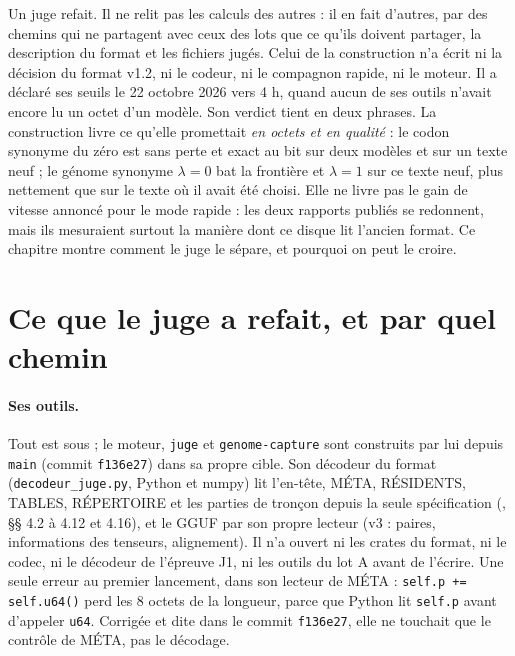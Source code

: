 \begin{enbref}
Un juge refait. Il ne relit pas les calculs des autres : il en fait d'autres, par des chemins qui ne partagent avec ceux des lots que ce qu'ils doivent partager, la description du format et les fichiers jugés. Celui de la construction n'a écrit ni la décision du format v1.2, ni le codeur, ni le compagnon rapide, ni le moteur. Il a déclaré ses seuils le 22 octobre 2026 vers 4 h, quand aucun de ses outils n'avait encore lu un octet d'un modèle. Son verdict tient en deux phrases. La construction livre ce qu'elle promettait \emph{en octets et en qualité} : le codon synonyme du zéro est sans perte et exact au bit sur deux modèles et sur un texte neuf ; le génome synonyme $\lambda = 0$ bat la frontière et $\lambda = 1$ sur ce texte neuf, plus nettement que sur le texte où il avait été choisi. Elle ne livre pas le gain de vitesse annoncé pour le mode rapide : les deux rapports publiés se redonnent, mais ils mesuraient surtout la manière dont ce disque lit l'ancien format. Ce chapitre montre comment le juge le sépare, et pourquoi on peut le croire.
\end{enbref}

\section{Ce que le juge a refait, et par quel chemin}\label{t3jug:sec:chemins}

\paragraph{Ses outils.} Tout est sous  ; le moteur, \texttt{juge} et \texttt{genome-capture} sont construits par lui depuis \texttt{main} (commit \texttt{f136e27}) dans sa propre cible. Son décodeur du format (\texttt{decodeur\_juge.py}, Python et numpy) lit l'en-tête, MÉTA, RÉSIDENTS, TABLES, RÉPERTOIRE et les parties de tronçon depuis la seule spécification (, §§ 4.2 à 4.12 et 4.16), et le GGUF par son propre lecteur (v3 : paires, informations des tenseurs, alignement). Il n'a ouvert ni les crates du format, ni le codec, ni le décodeur de l'épreuve J1, ni les outils du lot A avant de l'écrire. Une seule erreur au premier lancement, dans son lecteur de MÉTA : \texttt{self.p += self.u64()} perd les 8 octets de la longueur, parce que Python lit \texttt{self.p} avant d'appeler \texttt{u64}. Corrigée et dite dans le commit \texttt{f136e27}, elle ne touchait que le contrôle de MÉTA, pas le décodage.

